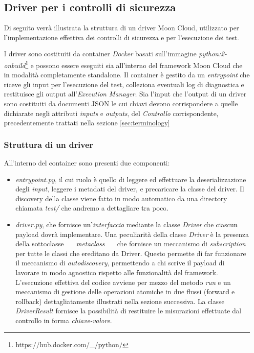 \documentclass[../main.tex]{subfiles}
\begin{document}
\subsection{Driver per i controlli di sicurezza}
Di seguito verrà illustrata la struttura di un driver Moon Cloud, utilizzato per l'implementazione effettiva dei controlli di sicurezza e per l'esecuzione dei test.

I driver sono costituiti da container \textit{Docker} basati sull'immagine \textit{python:2-onbuild}\footnote{https://hub.docker.com/\_/python/} e possono essere eseguiti sia all'interno del framework Moon Cloud che in modalità completamente standalone.
Il container è gestito da un \textit{entrypoint} che riceve gli input per l'esecuzione del test, colleziona eventuali log di diagnostica e restituisce gli output all'\textit{Execution Manager}.
Sia l'input che l'output di un driver sono costituiti da documenti JSON le cui chiavi devono corrispondere a quelle dichiarate negli attributi \textit{inputs} e \textit{outputs}, del \textit{Controllo} corrispondente, precedentemente trattati nella sezione \ref{sec:terminology}
\subsubsection{Struttura di un driver}
\label{subsec:strutturadriver}
All'interno del container sono presenti due componenti:
\begin{itemize}
    \item{\textit{entrypoint.py}}, il cui ruolo è quello di leggere ed effettuare la deserializzazione degli \textit{input}, leggere i metadati del driver, e precaricare la classe del driver.
        Il discovery della classe viene fatto in modo automatico da una directory chiamata \textit{test/} che andremo a dettagliare tra poco.
    \item{\textit{driver.py}}, che fornisce un'\textit{interfaccia} mediante la classe \textit{Driver} che ciascun payload dovrà implementare.
        Una peculiarità della classe \textit{Driver} è la presenza della sottoclasse \textit{\_\_metaclass\_\_} che fornisce un meccanismo di \textit{subscription} per tutte le classi che ereditano da Driver. Questo permette di far funzionare il meccanismo di \textit{autodiscovery}, permettendo a chi scrive il payload di lavorare in modo agnostico rispetto alle funzionalità del framework.
        L'esecuzione effettiva del codice avviene per mezzo del metodo \textit{run} e un meccanismo di gestione delle operazioni atomiche in due flussi (forward e rollback) dettagliatamente illustrati nella sezione successiva.
        La classe \textit{DriverResult} fornisce la possibilità di restituire le misurazioni effettuate dal controllo in forma \textit{chiave-valore}.
\end{itemize}
\end{document}
